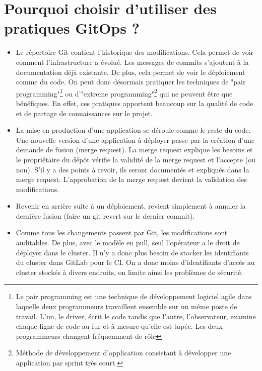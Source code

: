 \documentclass[11pt,fleqn]{book} %
\begin{document}
\section{Pourquoi choisir d'utiliser des pratiques GitOps ? }
\begin{itemize}
    \item Le répertoire Git contient l'historique des modifications. Cela permet de voir comment l'infrastructure a évolué. Les messages de commits s'ajoutent à la documentation déjà existante. De plus, cela permet de voir le déploiement comme du code. On peut donc désormais pratiquer les techniques de "pair programming"\footnote{Le pair programming est une technique de développement logiciel agile dans laquelle deux programmeurs travaillent ensemble sur un même poste de travail. L'un, le driver, écrit le code tandis que l'autre, l'observateur, examine chaque ligne de code au fur et à mesure qu'elle est tapée. Les deux programmeurs changent fréquemment de rôle
} ou d'"extreme programming"\footnote{Méthode de développement d'application consistant à développer une application par sprint très court.} qui ne peuvent être que bénéfiques. En effet, ces pratiques apportent beaucoup sur la qualité de code et de partage de connaissances sur le projet.
    \item La mise en production d'une application se déroule comme le reste du code. Une nouvelle version d'une application à déployer passe par la création d'une demande de fusion (merge request). La merge request explique les besoins et le propriétaire du dépôt vérifie la validité de la merge request et l'accepte (ou non). S’il y a des points à revoir, ils seront documentés et expliqués dans la merge request. L’approbation de la merge request devient la validation des modifications.
    \item Revenir en arrière suite à un déploiement, revient simplement à annuler la dernière fusion (faire un git revert sur le dernier commit).
    \item Comme tous les changements passent par Git, les modifications sont auditables. De plus, avec le  modèle en pull, seul l’opérateur a le droit de déployer dans le cluster. Il n'y a donc plus besoin de stocker les identifiants du cluster dans GitLab pour le CI. On a donc moins d'identifiants d'accès au cluster stockés à divers endroits, on limite ainsi les problèmes de sécurité.
\end{itemize}
\end{document}
